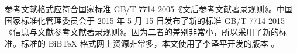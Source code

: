 

参考文献格式应符合国家标准 GB/T-7714-2005《文后参考文献著录规则》。中国国家标准化管理委员会于 2015 年 5 月 15 日发布了新的标准 GB/T 7714-2015《信息与文献参考文献著录规则》。因为二者的差别非常小，所以采用了新的标准。标准的 BiBTeX 格式网上资源非常多，本文使用了李泽平开发的版本 \cite{Lee2016}。

